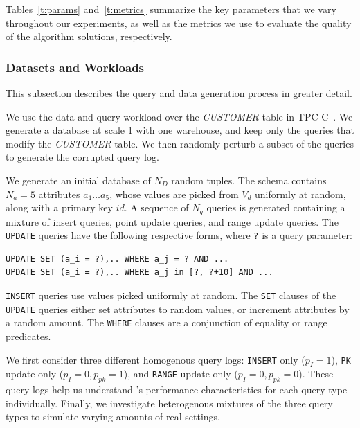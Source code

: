 Tables~\ref{t:params} and~\ref{t:metrics} summarize the key parameters that
we vary throughout our experiments, as well as the metrics we use to evaluate
the quality of the algorithm solutions, respectively.


\subsubsection{Datasets and Workloads}

This subsection describes the query and data generation process in greater detail.


 We use the data and query workload over the {\it
CUSTOMER} table in TPC-C~\cite{}.  We generate a database at scale
1 with one warehouse, and keep only the queries that modify the
{\it CUSTOMER} table.  We then randomly perturb a subset of the
queries to generate the corrupted query log.

 



We generate an initial database of $N_D$ random tuples.  
The schema contains $N_a=5$ attributes $a_1\ldots a_5$, whose values are
picked from $V_d$ uniformly at random, along with a primary key $id$.
A sequence of $N_q$ queries is generated containing a mixture of insert queries,
point update queries, and range update queries.  The \texttt{UPDATE} queries have
the following respective forms, where \verb|?| is a query parameter:

{\scriptsize
\begin{verbatim}
UPDATE SET (a_i = ?),.. WHERE a_j = ? AND ...
UPDATE SET (a_i = ?),.. WHERE a_j in [?, ?+10] AND ...
\end{verbatim}
}

\texttt{INSERT} queries use values picked uniformly at random.  
The \texttt{SET} clauses of the \texttt{UPDATE} queries either set attributes to random values, 
or increment attributes by a random amount.  The \texttt{WHERE} clauses are a
conjunction of equality or range predicates.

We first consider three different homogenous query logs: \texttt{INSERT} only ($p_I = 1$), 
\texttt{PK} update only ($p_I = 0, p_{pk} = 1$), and \texttt{RANGE} update only ($p_I = 0, p_{pk} = 0$).
These query logs help us understand \sys's performance characteristics for each query type individually.  
Finally, we investigate heterogenous mixtures of the three query types to simulate varying amounts of real settings.

